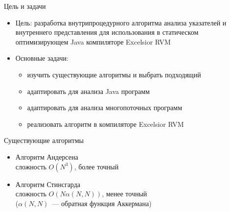 \documentclass[usenames,dvipsnames,pdftex,unicode]{beamer}
\begin{document}
\begin{frame}{Цель и задачи}

  \begin{itemize}
    \item Цель: разработка внутрипроцедурного алгоритма анализа указателей и
          внутреннего представления для использования в статическом
          оптимизирующем Java компиляторе Excelsior RVM
    \item Основные задачи:
      \begin{itemize}
        \item изучить существующие алгоритмы и выбрать подходящий
        \item адаптировать для анализа Java программ
        \item адаптировать для анализа многопоточных программ
        \item реализовать алгоритм в компиляторе Excelsior RVM
      \end{itemize}
  \end{itemize}

\end{frame}

\begin{frame}{Существующие алгоритмы}

  \begin{itemize}
    \item Алгоритм Андерсена\\сложность $O(N^3)$, более точный
    \item Алгоритм Стинсгарда\\сложность $O(N \alpha(N,N))$, менее точный\\
          {\small($\alpha(N,N)$~--- обратная функция Аккермана)}
  \end{itemize}

\end{frame}
\end{document}
